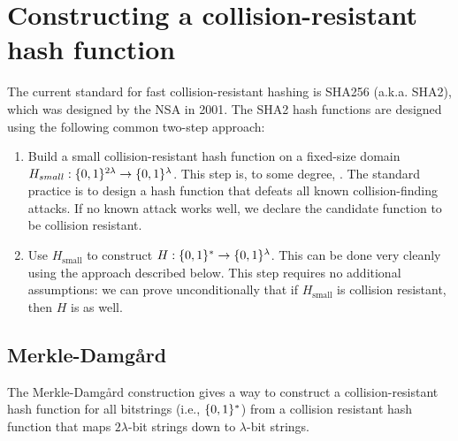 \section{Constructing a collision-resistant hash function}
The current standard for fast collision-resistant
hashing is SHA256 (a.k.a. SHA2), which was designed by the NSA in 2001.
The SHA2 hash functions are designed using the following common
two-step approach:


\begin{enumerate}
  \item Build a small collision-resistant hash
    function on a fixed-size domain $H_{small}: \{0,1\}^{2\lambda} \rightarrow \{0,1\}^\lambda$.
    This step is, to some degree, .
    The standard practice is to design a hash function that
    defeats all known collision-finding attacks.
    If no known attack works well, we declare the
    candidate function to be collision resistant.

	\item Use $H_{\text{small}}$ to construct $H: \{0,1\}^* \rightarrow \{0,1\}^\lambda$.
    This can be done very cleanly using the  approach described
    below.
    This step requires no additional assumptions:
    we can prove unconditionally that if $H_{\text{small}}$ is
    collision resistant, then $H$ is as well.
\end{enumerate}


\subsection{Merkle-Damg\aa{}rd}
The Merkle-Damg\aa{}rd construction gives a way to construct
a collision-resistant hash function for all bitstrings (i.e., $\{0,1\}^*$)
from a collision resistant hash function that maps $2\lambda$-bit strings
down to $\lambda$-bit strings.

